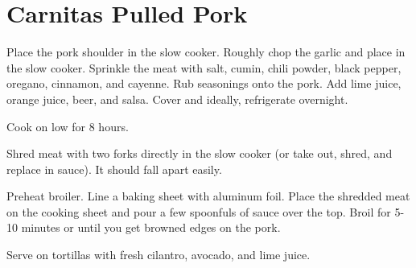 \section{Carnitas Pulled Pork}
\begin{recipe}
	
	

	Place the pork shoulder in the slow cooker. Roughly chop the garlic and place in the slow cooker. Sprinkle the meat with salt, cumin, chili powder, black pepper, oregano, cinnamon, and cayenne. Rub seasonings onto the pork. Add lime juice, orange juice, beer, and salsa. Cover and ideally, refrigerate overnight. 

	Cook on low for 8 hours.

	Shred meat with two forks directly in the slow cooker (or take out, shred, and replace in sauce). It should fall apart easily.
	
	Preheat broiler. Line a baking sheet with aluminum foil. Place the shredded meat on the cooking sheet and pour a few spoonfuls of sauce over the top. Broil for 5-10 minutes or until you get browned edges on the pork.
	

	Serve on tortillas with fresh cilantro, avocado, and lime juice.

\end{recipe}

